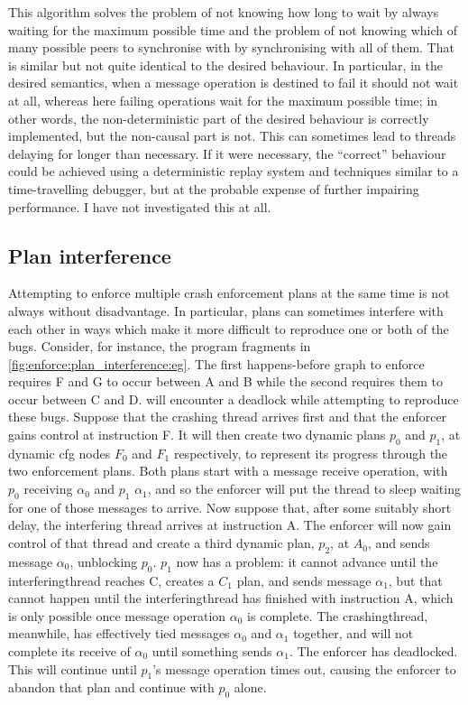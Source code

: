 This algorithm solves the problem of not knowing how long to wait by
always waiting for the maximum possible time and the problem of not
knowing which of many possible peers to synchronise with by
synchronising with all of them.  That is similar but not quite
identical to the desired behaviour.  In particular, in the desired
semantics, when a message operation is destined to fail it should not
wait at all, whereas here failing operations wait for the maximum
possible time; in other words, the non-deterministic part of the
desired behaviour is correctly implemented, but the non-causal part is
not.  This can sometimes lead to threads delaying for longer than
necessary.  If it were necessary, the ``correct'' behaviour could be
achieved using a deterministic replay system\cite{Choi1998} and
techniques similar to a time-travelling debugger\cite{Xu2003}, but at
the probable expense of further impairing performance.  I have not
investigated this at all.

\subsection{Plan interference}
\label{sect:enforce:plan_interference}

Attempting to enforce multiple crash enforcement plans at the same
time is not always without disadvantage.  In particular, plans can
sometimes interfere with each other in ways which make it more
difficult to reproduce one or both of the bugs.  Consider, for
instance, the program fragments in
\autoref{fig:enforce:plan_interference:eg}.  The first happens-before
graph to enforce requires F and G to occur between A and B while the
second requires them to occur between C and D.  {\Technique} will
encounter a deadlock while attempting to reproduce these bugs.
Suppose that the crashing thread arrives first and that the enforcer
gains control at instruction F.  It will then create two dynamic plans
$p_0$ and $p_1$, at dynamic \gls{cfg} nodes $F_0$ and $F_1$
respectively, to represent its progress through the two enforcement
plans.  Both plans start with a message receive operation, with $p_0$
receiving $\alpha_0$ and $p_1$ $\alpha_1$, and so the enforcer will
put the thread to sleep waiting for one of those messages to arrive.
Now suppose that, after some suitably short delay, the interfering
thread arrives at instruction A.  The enforcer will now gain control
of that thread and create a third dynamic plan, $p_2$, at $A_0$, and
sends message $\alpha_0$, unblocking $p_0$.  $p_1$ now has a problem:
it cannot advance until the \gls{interferingthread} reaches C, creates
a $C_1$ plan, and sends message $\alpha_1$, but that cannot happen
until the \gls{interferingthread} has finished with instruction A,
which is only possible once message operation $\alpha_0$ is complete.
The \gls{crashingthread}, meanwhile, has effectively tied messages
$\alpha_0$ and $\alpha_1$ together, and will not complete its receive
of $\alpha_0$ until something sends $\alpha_1$.  The enforcer has
deadlocked.  This will continue until $p_1$'s message operation times
out, causing the enforcer to abandon that plan and continue with $p_0$
alone.

